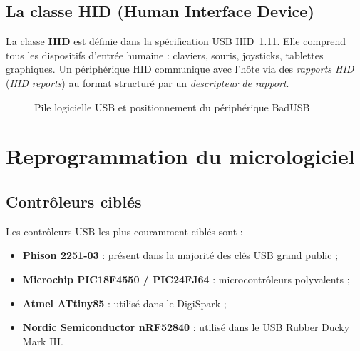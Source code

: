 \documentclass[12pt,a4paper]{report}
\begin{document}
\subsection{La classe HID (Human Interface Device)}

La classe \textbf{HID} est définie dans la spécification USB HID~1.11. Elle comprend tous les dispositifs d'entrée humaine : claviers, souris, joysticks, tablettes graphiques. Un périphérique HID communique avec l'hôte via des \textit{rapports HID} (\textit{HID reports}) au format structuré par un \textit{descripteur de rapport}.

\begin{figure}[H]
  \centering
  \caption{Pile logicielle USB et positionnement du périphérique BadUSB}
  \label{fig:usbstack}
\end{figure}

\section{Reprogrammation du micrologiciel}

\subsection{Contrôleurs ciblés}

Les contrôleurs USB les plus couramment ciblés sont :

\begin{itemize}
  \item \textbf{Phison 2251-03} : présent dans la majorité des clés USB grand public ;
  \item \textbf{Microchip PIC18F4550 / PIC24FJ64} : microcontrôleurs polyvalents ;
  \item \textbf{Atmel ATtiny85} : utilisé dans le DigiSpark ;
  \item \textbf{Nordic Semiconductor nRF52840} : utilisé dans le USB Rubber Ducky Mark III.
\end{itemize}
\end{document}
